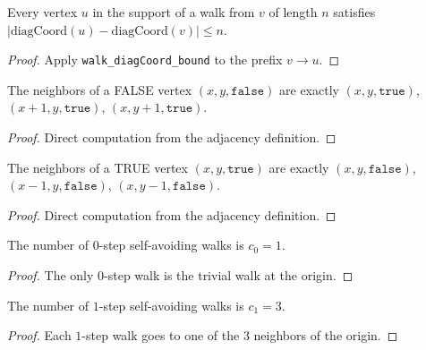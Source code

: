 \begin{lemma}
\begin{enumerate}
\begin{lemma}\label{lem:walk-support-diagcoord}
\leanok
{}
  Every vertex $u$ in the support of a walk from $v$ of length $n$
  satisfies $|\mathrm{diagCoord}(u) - \mathrm{diagCoord}(v)| \leq n$.
\end{lemma}
\begin{proof}\leanok
  Apply \texttt{walk\_diagCoord\_bound} to the prefix $v \to u$.
\end{proof}

\begin{lemma}\label{lem:false-neighbors}
\leanok
{}
  The neighbors of a FALSE vertex $(x,y,\mathtt{false})$ are exactly
  $(x,y,\mathtt{true})$, $(x{+}1,y,\mathtt{true})$, $(x,y{+}1,\mathtt{true})$.
\end{lemma}
\begin{proof}\leanok
  Direct computation from the adjacency definition.
\end{proof}

\begin{lemma}\label{lem:true-neighbors}
\leanok
{}
  The neighbors of a TRUE vertex $(x,y,\mathtt{true})$ are exactly
  $(x,y,\mathtt{false})$, $(x{-}1,y,\mathtt{false})$, $(x,y{-}1,\mathtt{false})$.
\end{lemma}
\begin{proof}\leanok
  Direct computation from the adjacency definition.
\end{proof}

\begin{lemma}[SAW count $c_0 = 1$]\label{lem:c0}
\leanok
{}
  The number of $0$-step self-avoiding walks is $c_0 = 1$.
\end{lemma}
\begin{proof}\leanok
  The only $0$-step walk is the trivial walk at the origin.
\end{proof}

\begin{lemma}[SAW count $c_1 = 3$]\label{lem:c1}
\leanok
{}
  The number of $1$-step self-avoiding walks is $c_1 = 3$.
\end{lemma}
\begin{proof}\leanok
  Each $1$-step walk goes to one of the $3$ neighbors of the origin.
\end{proof}


\end{enumerate}
\end{lemma}
